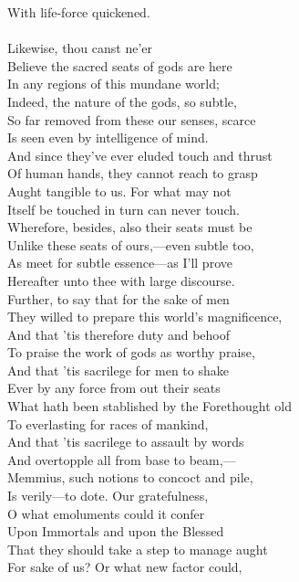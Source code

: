 With life-force quickened.\\
\\
Likewise, thou canst ne'er\\
Believe the sacred seats of gods are here\\
In any regions of this mundane world;\\
Indeed, the nature of the gods, so subtle,\\
So far removed from these our senses, scarce\\
Is seen even by intelligence of mind.\\
And since they've ever eluded touch and thrust\\
Of human hands, they cannot reach to grasp\\
Aught tangible to us. For what may not\\
Itself be touched in turn can never touch.\\
Wherefore, besides, also their seats must be\\
Unlike these seats of ours,—even subtle too,\\
As meet for subtle essence—as I'll prove\\
Hereafter unto thee with large discourse.\\
Further, to say that for the sake of men\\
They willed to prepare this world's magnificence,\\
And that 'tis therefore duty and behoof\\
To praise the work of gods as worthy praise,\\
And that 'tis sacrilege for men to shake\\
Ever by any force from out their seats\\
What hath been stablished by the Forethought old\\
To everlasting for races of mankind,\\
And that 'tis sacrilege to assault by words\\
And overtopple all from base to beam,—\\
Memmius, such notions to concoct and pile,\\
Is verily—to dote. Our gratefulness,\\
O what emoluments could it confer\\
Upon Immortals and upon the Blessed\\
That they should take a step to manage aught\\
For sake of us? Or what new factor could,\\
